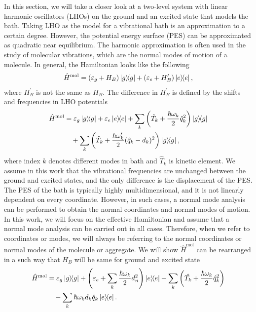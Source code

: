 In this section, we will take a closer look at a two-level system with linear harmonic oscillators (LHOs) on the ground and an excited state that models the bath. Taking LHO as the model for a vibrational bath is an approximation to a certain degree. However, the potential energy surface (PES) can be approximated as quadratic near equilibrium. The harmonic approximation is often used in the study of molecular vibrations, which are the normal modes of motion of a molecule. In general, the Hamiltonian looks like the following
\begin{equation}
    \hat{H}^\text{mol} = (\varepsilon_g + H_B )\ketbra{g} + (\varepsilon_e + H_B^\prime )\ketbra{e},
\end{equation}
where $H_B^\prime$ is not the same as $H_B$. The difference in $H_B^\prime$ is defined by the shifts and frequencies in LHO potentials
\begin{equation}
    \begin{aligned}
    \hat{H}^\text{mol}&= \varepsilon_g \ketbra{g} + \varepsilon_e \ketbra{e} + \sum_k \left(\hat{T}_k + \frac{\hbar \omega_k}{2}\hat{q}^2_k\right)\ketbra{g} \\
    &\quad +\sum_k \left(\hat{T}_k + \frac{\hbar \omega^\prime_k}{2}(\hat{q}_k - d_k)^2\right)\ketbra{g}, \\
    \end{aligned}
\end{equation}
where index $k$ denotes different modes in bath and $\hat{T}_k$ is kinetic element. We assume in this work that the vibrational frequencies are unchanged between the ground and excited states, and the only difference is the displacement of the PES. The PES of the bath is typically highly multidimensional, and it is not linearly dependent on every coordinate. However, in such cases, a normal mode analysis can be performed to obtain the normal coordinates and normal modes of motion. In this work, we will focus on the effective Hamiltonian and assume that a normal mode analysis can be carried out in all cases. Therefore, when we refer to coordinates or modes, we will always be referring to the normal coordinates or normal modes of the molecule or aggregate. We will show $\hat{H}^\text{mol}$ can be rearranged in a such way that $H_B$ will be same for ground and excited state
\begin{equation}
    \begin{aligned}
    \hat{H}^\text{mol} &= \varepsilon_g \ketbra{g} + \left(\varepsilon_e + \sum_k \frac{\hbar\omega_k}{2} d_n^2\right)\ketbra{e} + \sum_k \left(\hat{T_k} + \frac{\hbar \omega_k}{2}\hat{q}^2_k\right)\\
    &\quad -\sum_k \hbar\omega_k d_k\hat{q}_k\ketbra{e}.
    \end{aligned}
\end{equation}

